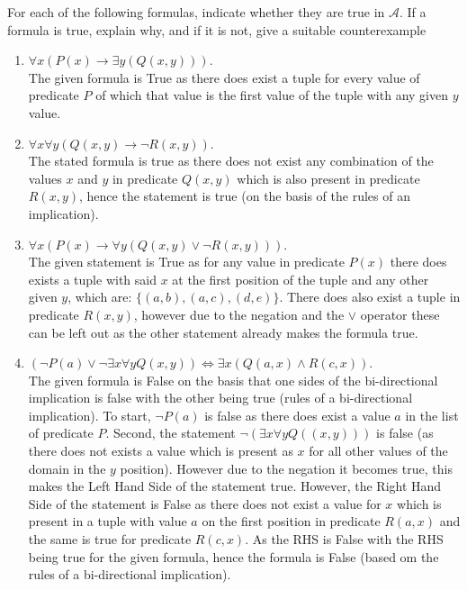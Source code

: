 \documentclass[a4paper]{article}
\begin{document}
\begin{enumerate}
    For each of the following formulas, indicate whether they are true in $\mathcal{A}$. If a formula is true, explain why, and if it is not, give a suitable counterexample
    \begin{enumerate}
        \item $\forall x(P(x)\to\exists y(Q(x,y)))$.\\
        The given formula is True as there does exist a tuple for every value of predicate $P$ of which that value is the first value of the tuple with any given $y$ value.
        \item $\forall x\forall y(Q(x,y)\to\neg R(x,y))$.\\
        The stated formula is true as there does not exist any combination of the values $x$ and $y$ in predicate $Q(x,y)$ which is also present in predicate $R(x,y)$, hence the statement is true (on the basis of the rules of an implication).
        \item $\forall x(P(x)\to\forall y(Q(x,y)\vee\neg R(x,y)))$. \\
        The given statement is True as for any value in predicate $P(x)$ there does exists a tuple with said $x$ at the first position of the tuple and any other given $y$, which are: $\{(a,b), (a,c), (d,e)\} $.
        There does also exist a tuple in predicate $R(x,y)$, however due to the negation and the $\lor$ operator these can be left out as the other statement already makes the formula true.
        \item $(\neg P(a)\vee\neg\exists x\forall yQ(x,y))\iff\exists x(Q(a,x)\wedge R(c,x))$. \\
        The given formula is False on the basis that one sides of the bi-directional implication is false with the other being true (rules of a bi-directional implication).
        To start, $\neg P(a)$ is false as there does exist a value $a$ in the list of predicate $P$.
        Second, the statement $\neg (\exists x\forall yQ((x,y)))$ is false (as there does not exists a value which is present as $x$ for all other values of the domain in the $y$ position). However due to the negation it becomes true, this makes the Left Hand Side of the statement true.
        However, the Right Hand Side of the statement is False as there does not exist a value for $x$ which is present in a tuple with value $a$ on the first position in predicate $R(a,x)$ and the same is true for predicate $R(c,x)$.
        As the RHS is False with the RHS being true for the given formula, hence the formula is False (based om the rules of a bi-directional implication).

\end{enumerate}
\end{enumerate}
\end{document}
